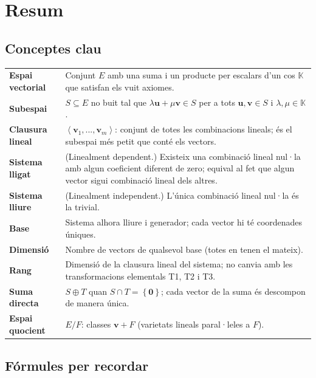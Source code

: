 
\chapter{Resum}

\section{Conceptes clau}

\begin{center}
\renewcommand{\arraystretch}{1.35}
\begin{tabular}{p{}p{}}
\textbf{Espai vectorial} & Conjunt $E$ amb una suma i un producte per escalars d'un cos $\mathbb{K}$ que satisfan els vuit axiomes. \\
\textbf{Subespai} & $S\subseteq E$ no buit tal que $\lambda \mathbf{u}+\mu \mathbf{v}\in S$ per a tots $\mathbf{u},\mathbf{v}\in S$ i $\lambda ,\mu \in \mathbb{K}$. \\
\textbf{Clausura lineal} & $\left\langle \mathbf{v}_{1},...,\mathbf{v}_{m}\right\rangle $: conjunt de totes les combinacions lineals; és el subespai més petit que conté els vectors. \\
\textbf{Sistema lligat} & (Linealment dependent.) Existeix una combinació lineal nul·la amb algun coeficient diferent de zero; equival al fet que algun vector sigui combinació lineal dels altres. \\
\textbf{Sistema lliure} & (Linealment independent.) L'única combinació lineal nul·la és la trivial. \\
\textbf{Base} & Sistema alhora lliure i generador; cada vector hi té coordenades úniques. \\
\textbf{Dimensió} & Nombre de vectors de qualsevol base (totes en tenen el mateix). \\
\textbf{Rang} & Dimensió de la clausura lineal del sistema; no canvia amb les transformacions elementals T1, T2 i T3. \\
\textbf{Suma directa} & $S\oplus T$ quan $S\cap T=\left\{ \mathbf{0}\right\} $; cada vector de la suma és descompon de manera única. \\
\textbf{Espai quocient} & $E/F$: classes $\mathbf{v}+F$ (varietats lineals paral·leles a $F$).
\end{tabular}
\end{center}

\section{Fórmules per recordar}

